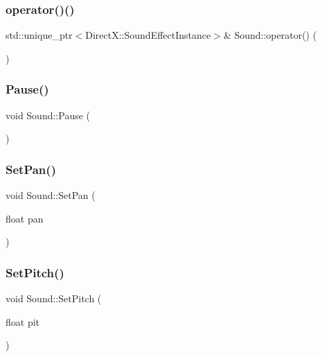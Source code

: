 \subsubsection{\texorpdfstring{operator()()}{operator()()}}
{\footnotesize\ttfamily std\+::unique\+\_\+ptr$<$Direct\+X\+::\+Sound\+Effect\+Instance$>$\& Sound\+::operator() (\begin{DoxyParamCaption}{ }\end{DoxyParamCaption})\hspace{0.3cm}{\ttfamily [inline]}}

\mbox{\label{class_sound_a4e199b4346519a4977fe94998c4a77e7}} 
\subsubsection{\texorpdfstring{Pause()}{Pause()}}
{\footnotesize\ttfamily void Sound\+::\+Pause (\begin{DoxyParamCaption}{ }\end{DoxyParamCaption})\hspace{0.3cm}{\ttfamily [inline]}}

\mbox{\label{class_sound_a1b066e78405656b1475849139ca24dce}} 
\subsubsection{\texorpdfstring{Set\+Pan()}{SetPan()}}
{\footnotesize\ttfamily void Sound\+::\+Set\+Pan (\begin{DoxyParamCaption}\item[{float}]{pan }\end{DoxyParamCaption})\hspace{0.3cm}{\ttfamily [inline]}}

\mbox{\label{class_sound_a06b9680efb2b6b41b52d9f25ac0264f1}} 
\subsubsection{\texorpdfstring{Set\+Pitch()}{SetPitch()}}
{\footnotesize\ttfamily void Sound\+::\+Set\+Pitch (\begin{DoxyParamCaption}\item[{float}]{pit }\end{DoxyParamCaption})\hspace{0.3cm}{\ttfamily [inline]}}


